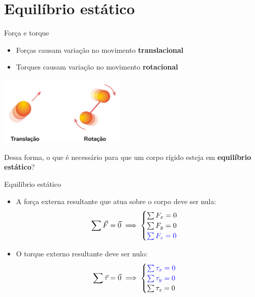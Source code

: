 \documentclass[t,%
brazilian,%
11pt,%
aspectratio=169,%
table%
]{beamer}
\begin{document}
\section{Equilíbrio estático}

\begin{frame}{Força e torque}
    \begin{itemize}
        \item Forças causam variação no movimento \textbf{translacional}
        \item Torques causam variação no movimento \textbf{rotacional}
    \end{itemize}
    \begin{center}
        \includegraphics[width=6cm]{images/translação-rotação.png}
    \end{center}
    \pause
    Dessa forma, o que é necessário para que um corpo rígido esteja em \textbf{equilíbrio estático}?
\end{frame}

\begin{frame}{Equilíbrio estático}
    \begin{itemize}[<+->]
        \item A força externa resultante que atua sobre o corpo deve ser nula:
            \[
                \sum \vec{F}=\vec{0} \implies
                \begin{cases}
                    \sum F_x =0 \\ \sum F_y =0 \\ \textcolor{blue}{\sum F_z =0}
                \end{cases}
            \]

        \item O torque externo resultante deve ser nulo:
            \[
                \sum \vec{\tau}=\vec{0} \implies
                \begin{cases}
                    \textcolor{blue}{\sum \tau_x =0} \\
                    \textcolor{blue}{\sum \tau_y =0} \\
                    \sum \tau_z =0
                \end{cases}
            \]
    \end{itemize}
\end{frame}
\end{document}
